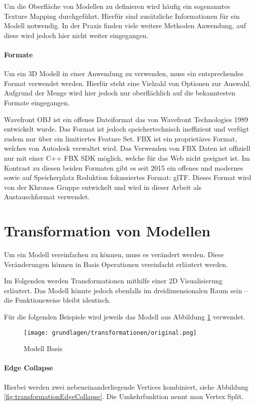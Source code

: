 Um die Oberfläche von Modellen zu definieren wird häufig ein sogenanntes Texture Mapping durchgeführt. Hierfür sind zusätzliche Informationen für ein Modell notwendig. In der Praxis finden viele weitere Methoden Anwendung, auf diese wird jedoch hier nicht weiter eingegangen.

\paragraph{Formate}
Um ein 3D Modell in einer Anwendung zu verwenden, muss ein entsprechendes Format verwendet werden. Hierfür steht eine Vielzahl von Optionen zur Auswahl. Aufgrund der Menge wird hier jedoch nur oberflächlich auf die bekanntesten Formate eingegangen.

Wavefront OBJ ist ein offenes Dateiformat das von Wavefront Technologies 1989 entwickelt wurde. Das Format ist jedoch speichertechnisch ineffizient und verfügt zudem nur über ein limitiertes Feature Set.
FBX ist ein proprietäres Format, welches von Autodesk verwaltet wird. Das Verwenden von FBX Daten ist offiziell nur mit einer C++ FBX SDK möglich, welche für das Web nicht geeignet ist.
Im Kontrast zu diesen beiden Formaten gibt es seit 2015 ein offenes und modernes sowie auf Speicherplatz Reduktion fokussiertes Format: glTF. Dieses Format wird von der Khronos Gruppe entwickelt und wird in dieser Arbeit als Austauschformat verwendet.

\section{Transformation von Modellen}

Um ein Modell vereinfachen zu können, muss es verändert werden.
Diese Veränderungen können in Basis Operationen vereinfacht erläutert werden.

Im Folgenden werden Transformationen mithilfe einer 2D Visualisierung erläutert. Das Modell könnte jedoch ebenfalls im dreidimensionalen Raum sein – die Funktionsweise bleibt identisch.

Für die folgenden Beispiele wird jeweils das Modell aus Abbildung \ref{fig:transformationOriginal} verwendet.

\begin{figure}[H]
  \centering
  \texttt{[image: grundlagen/transformationen/original.png]}
  \caption{Modell Basis}
  \label{fig:transformationOriginal}
\end{figure}

\paragraph{Edge Collapse}
Hierbei werden zwei nebeneinanderliegende Vertices kombiniert, siehe Abbildung \ref{fig:transformationEdgeCollapse}.
Die Umkehrfunktion nennt man Vertex Split.


